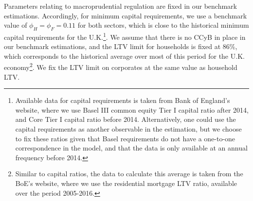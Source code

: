 \documentclass[12pt]{article}
\numberwithin{equation}{section}
\begin{document}
Parameters relating to macroprudential regulation are fixed in our benchmark estimations. Accordingly, for minimum capital requirements, we use a benchmark value of $\phi_H=\phi_F=0.11$ for both sectors, which is close to the historical minimum capital requirements for the U.K.\footnote{Available data for capital requirements is taken from Bank of England's website, where we use Basel III common equity Tier I capital ratio after 2014, and Core Tier I capital ratio before 2014. Alternatively, one could use the capital requirements as another observable in the estimation, but we choose to fix these ratios given that Basel requirements do not have a one-to-one correspondence in the model, and that the data is only available at an annual frequency before 2014.}. We assume that there is no CCyB in place in our benchmark estimations, and the LTV limit for households is fixed at 86\%, which corresponds to the historical average over most of this period for the U.K. economy\footnote{Similar to capital ratios, the data to calculate this average is taken from the BoE's website, where we use the residential mortgage LTV ratio, available over the period 2005-2016.}. We fix the LTV limit on corporates at the same value as household LTV. 
\end{document}
